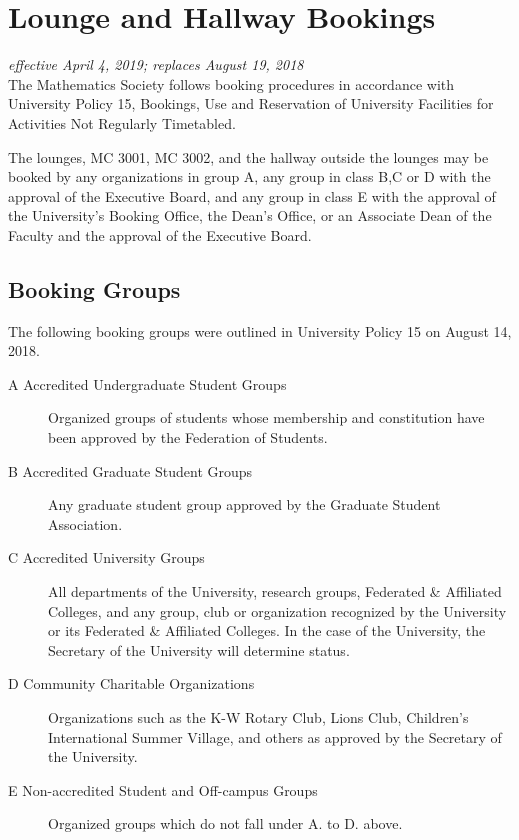 \section{Lounge and Hallway Bookings}
\emph{effective April 4, 2019; replaces August 19, 2018}\\

The Mathematics Society follows booking procedures in accordance with 
University Policy 15, Bookings, Use and Reservation of University Facilities
for Activities Not Regularly Timetabled. 

The lounges, MC 3001, MC 3002, and the hallway outside the lounges may be
booked by any organizations in group A, any group in class B,C or D with the approval of the Executive Board, and any group in class E with the approval of the University’s Booking Office, the Dean’s Office, or an Associate Dean of the Faculty and the approval of the Executive Board.


\subsection{Booking Groups}

The following booking groups were outlined in University Policy 15 on 
August 14, 2018.

\begin{description}
\item[A\: Accredited Undergraduate Student Groups] Organized groups of students
    whose membership and constitution have been approved by the Federation of
    Students.

\item[B\: Accredited Graduate Student Groups] Any graduate student group
    approved by the Graduate Student Association.

\item[C\: Accredited University Groups] All departments of the University,
    research groups, Federated \& Affiliated Colleges, and any group, club or
    organization recognized by the University or its Federated \& Affiliated
    Colleges. In the case of the University, the Secretary of the University
    will determine status.

\item[D\: Community Charitable Organizations] Organizations such as the K-W
    Rotary Club, Lions Club, Children's International Summer Village, and
    others as approved by the Secretary of the University.

\item[E\: Non-accredited Student and Off-campus Groups] Organized groups which
    do not fall under A. to D. above.
\end{description}

